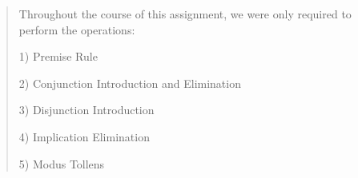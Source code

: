 \begin{quote}
Throughout the course of this assignment, we were only required to perform the operations\+:
\begin{DoxyItemize}
\item 1) Premise Rule
\item 2) Conjunction Introduction and Elimination
\item 3) Disjunction Introduction
\item 4) Implication Elimination
\item 5) Modus Tollens ~\newline
~\newline
 
\end{DoxyItemize}\end{quote}
\begin{quote}


\end{quote}
